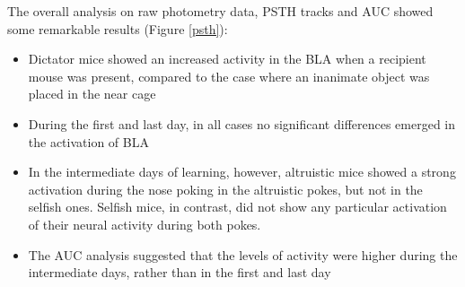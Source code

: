 \documentclass[12pt, a4paper]{report}
\begin{document}
The overall analysis on raw photometry data, PSTH tracks and AUC showed some remarkable results (Figure \ref{psth}):

\begin{itemize}
	
	\item Dictator mice showed an increased activity in the BLA when a recipient mouse was present, compared to the case where an inanimate object was placed in the near cage
	
	\item During the first and last day, in all cases no significant differences emerged in the activation of BLA
	
	\item In the intermediate days of learning, however, altruistic mice showed a strong activation during the nose poking in the altruistic pokes, but not in the selfish ones. Selfish mice, in contrast, did not show any particular activation of their neural activity during both pokes. 
	
	\item The AUC analysis suggested that the levels of activity were higher during the intermediate days, rather than in the first and last day
\end{itemize}
\end{document}
